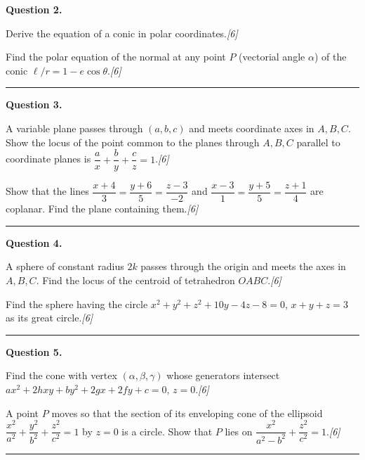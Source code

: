 \documentclass[11pt,a4paper]{article}
\newcommand{\pts}[1]{\hfill   \textit{[#1]}}
\begin{document}
\medskip


\noindent   \textbf{Question 2.}

\begin{parts}
  \item Derive the equation of a conic in polar coordinates.\pts{6}
  \item Find the polar equation of the normal at any point $P$ (vectorial angle $\alpha$) of the conic $\ell/r=1-e\cos \theta$.\pts{6}
\end{parts}
\medskip\rule{\linewidth}{0.2pt}

\medskip


\noindent   \textbf{Question 3.}

\begin{parts}
  \item A variable plane passes through $(a,b,c)$ and meets coordinate axes in $A,B,C$. Show the locus of the point common to the planes through $A,B,C$ parallel to coordinate planes is $\dfrac{a}{x}+\dfrac{b}{y}+\dfrac{c}{z}=1$.\pts{6}
  \item Show that the lines $\dfrac{x+4}{3}=\dfrac{y+6}{5}=\dfrac{z-3}{-2}$ and $\dfrac{x-3}{1}=\dfrac{y+5}{5}=\dfrac{z+1}{4}$ are coplanar. Find the plane containing them.\pts{6}
\end{parts}
\medskip\rule{\linewidth}{0.2pt}

\medskip


\noindent   \textbf{Question 4.}

\begin{parts}
  \item A sphere of constant radius $2k$ passes through the origin and meets the axes in $A,B,C$. Find the locus of the centroid of tetrahedron $OABC$.\pts{6}
  \item Find the sphere having the circle $x^2+y^2+z^2+10y-4z-8=0$, $x+y+z=3$ as its great circle.\pts{6}
\end{parts}
\medskip\rule{\linewidth}{0.2pt}

\medskip


\noindent   \textbf{Question 5.}

\begin{parts}
  \item Find the cone with vertex $(\alpha,\beta,\gamma)$ whose generators intersect $ax^2+2hxy+by^2+2gx+2fy+c=0$, $z=0$.\pts{6}
  \item A point $P$ moves so that the section of its enveloping cone of the ellipsoid $\dfrac{x^2}{a^2}+\dfrac{y^2}{b^2}+\dfrac{z^2}{c^2}=1$ by $z=0$ is a circle. Show that $P$ lies on $\dfrac{x^2}{a^2-b^2}+\dfrac{z^2}{c^2}=1$.\pts{6}
\end{parts}
\medskip\rule{\linewidth}{0.2pt}
\end{document}
